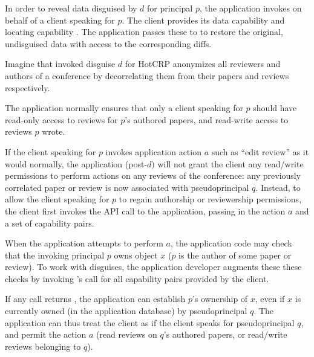 In order to reveal data disguised by $d$ for principal $p$, the application invokes
 on behalf of a client speaking for $p$. The client provides its data capability
 and locating capability . The application passes these to \sys to restore the original, undisguised data with
access to the corresponding diffs.


Imagine that invoked disguise $d$ for HotCRP anonymizes all reviewers and authors of a conference by
decorrelating them from their papers and reviews respectively.

The application normally ensures that only a client speaking for $p$ should have read-only access to
reviews for $p$'s authored papers, and read-write access to reviews $p$ wrote.

If the client speaking for $p$ invokes application action $a$ such as ``edit review'' as it would
normally, the application (post-$d)$ will not grant the client any read/write permissions to perform
actions on any reviews of the conference: any previously correlated paper or review is now
associated with pseudoprincipal $q$.  Instead, to allow the client speaking for $p$ to regain
authorship or reviewership permissions, the client first invokes the  API call to
the application, passing in the action $a$ and a set of capability pairs.  

When the application attempts to perform $a$, the application code may check that the invoking
principal $p$ owns object $x$ (\eg $p$ is the author of some paper or review). To work with
disguises, the application developer augments these these checks by invoking \sys's
 call for all capability pairs provided by
the client.

If any call returns , the application can establish $p$'s ownership of $x$, even if $x$ is
currently owned (in the application database) by pseudoprincipal $q$. The application can thus treat
the client as if the client speaks for pseudoprincipal $q$, and permit the action $a$ (\eg read
reviews on $q$'s authored papers, or read/write reviews belonging to $q$).

